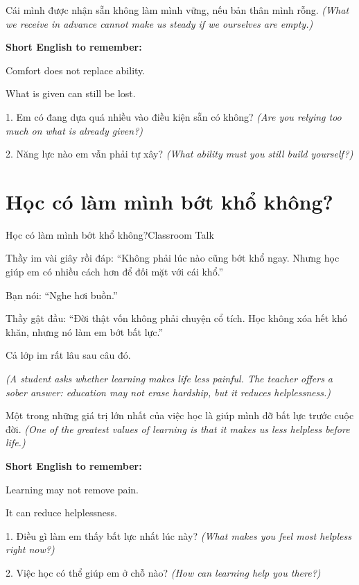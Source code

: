 \begin{baihoc}
Cái mình được nhận sẵn không làm mình vững, nếu bản thân mình rỗng.
\textit{(What we receive in advance cannot make us steady if we ourselves are empty.)}
\end{baihoc}

\begin{ghinhoanh}
\textbf{Short English to remember:}

Comfort does not replace ability.

What is given can still be lost.
\end{ghinhoanh}

\begin{tuhocnhanh}
1. Em có đang dựa quá nhiều vào điều kiện sẵn có không? \textit{(Are you relying too much on what is already given?)}

2. Năng lực nào em vẫn phải tự xây? \textit{(What ability must you still build yourself?)}
\end{tuhocnhanh}
\ngancach

\section{Học có làm mình bớt khổ không?}
\begin{truyen}{Học có làm mình bớt khổ không?}{Classroom Talk}

Thầy im vài giây rồi đáp: ``Không phải lúc nào cũng bớt khổ ngay. Nhưng học giúp em có nhiều cách hơn để đối mặt với cái khổ.''

Bạn nói: ``Nghe hơi buồn.''

Thầy gật đầu: ``Đời thật vốn không phải chuyện cổ tích. Học không xóa hết khó khăn, nhưng nó làm em bớt bất lực.''

Cả lớp im rất lâu sau câu đó.

\textit{(A student asks whether learning makes life less painful. The teacher offers a sober answer: education may not erase hardship, but it reduces helplessness.)}
\end{truyen}

\begin{baihoc}
Một trong những giá trị lớn nhất của việc học là giúp mình đỡ bất lực trước cuộc đời.
\textit{(One of the greatest values of learning is that it makes us less helpless before life.)}
\end{baihoc}

\begin{ghinhoanh}
\textbf{Short English to remember:}

Learning may not remove pain.

It can reduce helplessness.
\end{ghinhoanh}

\begin{tuhocnhanh}
1. Điều gì làm em thấy bất lực nhất lúc này? \textit{(What makes you feel most helpless right now?)}

2. Việc học có thể giúp em ở chỗ nào? \textit{(How can learning help you there?)}
\end{tuhocnhanh}
\ngancach